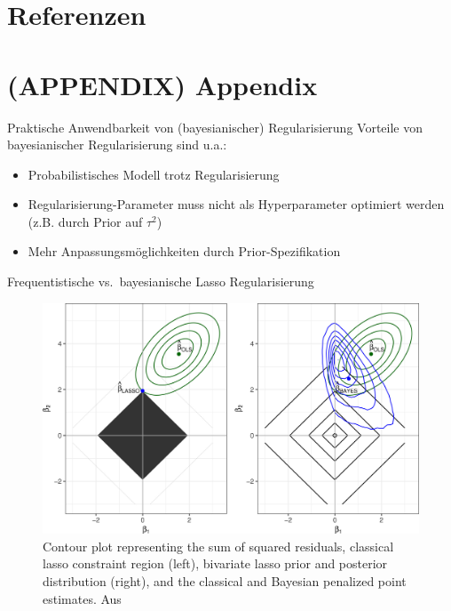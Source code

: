 \documentclass[
  ignorenonframetext,
  aspectratio=169,
]{beamer}
\providecommand{\tightlist}{%
  \setlength{\itemsep}{0pt}\setlength{\parskip}{0pt}}
\newcommand{\taus}{\tau^2}
\begin{document}
\section{Referenzen}\label{referenzen}

\section*{(APPENDIX) Appendix}\label{appendix-appendix}

\begin{frame}{Praktische Anwendbarkeit von (bayesianischer)
Regularisierung}
\protect{}\label{praktische-anwendbarkeit-von-bayesianischer-regularisierung}
Vorteile von bayesianischer Regularisierung sind u.a.:

\begin{itemize}
\tightlist
\item
  Probabilistisches Modell trotz Regularisierung
\item
  Regularisierung-Parameter muss nicht als Hyperparameter optimiert
  werden (z.B. durch Prior auf \(\taus\))
\item
  Mehr Anpassungsmöglichkeiten durch Prior-Spezifikation
\end{itemize}
\end{frame}

\begin{frame}{Frequentistische vs.~bayesianische Lasso Regularisierung}
\protect{}\label{frequentistische-vs.-bayesianische-lasso-regularisierung}
\begin{figure}
\centering
\includegraphics[width=\linewidth,height=0.75\textheight,keepaspectratio]{../figures/van_erp_fig2_lasso.jpg}
\caption{Contour plot representing the sum of squared residuals,
classical lasso constraint region (left), bivariate lasso prior and
posterior distribution (right), and the classical and Bayesian penalized
point estimates. Aus \textcite{van_erp_shrinkage_2019}}
\end{figure}
\end{frame}
\end{document}
